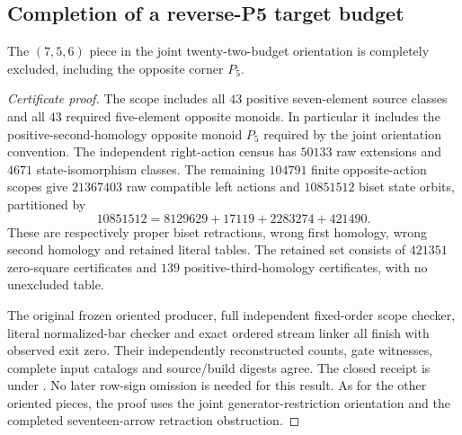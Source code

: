 \subsection{Completion of a reverse-P5 target budget}

\begin{proposition}
\label{CP2:A-oriented-eighteen-seven-five-six}
The $(7,5,6)$ piece in the joint twenty-two-budget
orientation is completely excluded, including the
opposite corner $P_5$.
\end{proposition}
\begin{proof}[Certificate proof]
The scope includes all $43$ positive seven-element
source classes and all $43$ required five-element
opposite monoids.  In particular it includes the
positive-second-homology opposite monoid $P_5$ required
by the joint orientation convention.
The independent right-action census has $50133$ raw
extensions and $4671$ state-isomorphism classes.
The remaining $104791$ finite opposite-action scopes
give $21367403$ raw compatible left actions and
$10851512$ biset state orbits, partitioned by
\[
 10851512=8129629+17119+2283274+421490.
\]
These are respectively proper biset retractions, wrong
first homology, wrong second homology and retained
literal tables.  The retained set consists of $421351$
zero-square certificates and $139$ positive-third-homology
certificates, with no unexcluded table.

The original frozen oriented producer, full independent
fixed-order scope checker, literal normalized-bar checker
and exact ordered stream linker all finish with observed
exit zero.  Their independently reconstructed counts,
gate witnesses, complete input catalogs and source/build
digests agree.  The closed receipt is
 under
.
No later row-sign omission is needed for this result.
As for the other oriented pieces, the proof uses the
joint generator-restriction orientation and the completed
seventeen-arrow retraction obstruction.
\end{proof}
